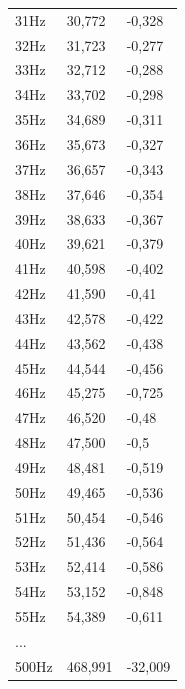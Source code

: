 \begin{tabularx}{\textwidth}{lll}
31Hz
 &
30,772
 &
-0,328
\\

32Hz
 &
31,723
 &
-0,277
\\

33Hz
 &
32,712
 &
-0,288
\\

34Hz
 &
33,702
 &
-0,298
\\

35Hz
 &
34,689
 &
-0,311
\\

36Hz
 &
35,673
 &
-0,327
\\

37Hz
 &
36,657
 &
-0,343
\\

38Hz
 &
37,646
 &
-0,354
\\

39Hz
 &
38,633
 &
-0,367
\\

40Hz
 &
39,621
 &
-0,379
\\

41Hz
 &
40,598
 &
-0,402
\\

42Hz
 &
41,590
 &
-0,41
\\

43Hz
 &
42,578
 &
-0,422
\\

44Hz
 &
43,562
 &
-0,438
\\

45Hz
 &
44,544
 &
-0,456
\\

46Hz
 &
45,275
 &
-0,725
\\

47Hz
 &
46,520
 &
-0,48
\\

48Hz
 &
47,500
 &
-0,5
\\

49Hz
 &
48,481
 &
-0,519
\\

50Hz
 &
49,465
 &
-0,536
\\

51Hz
 &
50,454
 &
-0,546
\\

52Hz
 &
51,436
 &
-0,564
\\

53Hz
 &
52,414
 &
-0,586
\\

54Hz
 &
53,152
 &
-0,848
\\

55Hz
 &
54,389
 &
-0,611
\\

...
 &  & \\

500Hz
 &
468,991
 &
-32,009
\\
\hline
\end{tabularx}


